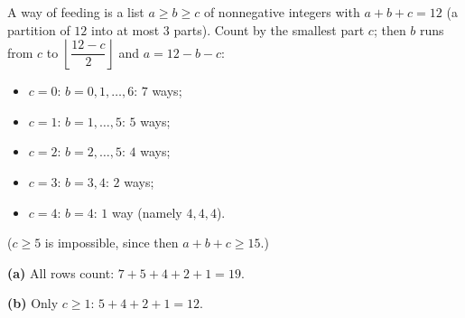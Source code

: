 A way of feeding is a list $a\ge b\ge c$ of nonnegative integers with $a+b+c=12$ (a partition of $12$ into at most $3$ parts). Count by the smallest part $c$; then $b$ runs from $c$ to $\left\lfloor\dfrac{12-c}{2}\right\rfloor$ and $a=12-b-c$:
\begin{itemize}
\item $c=0$: $b=0,1,\dots,6$: $7$ ways;
\item $c=1$: $b=1,\dots,5$: $5$ ways;
\item $c=2$: $b=2,\dots,5$: $4$ ways;
\item $c=3$: $b=3,4$: $2$ ways;
\item $c=4$: $b=4$: $1$ way (namely $4,4,4$).
\end{itemize}
($c\ge5$ is impossible, since then $a+b+c\ge15$.)

\textbf{(a)} All rows count: $7+5+4+2+1=\boxed{19}$.

\textbf{(b)} Only $c\ge1$: $5+4+2+1=\boxed{12}$.

